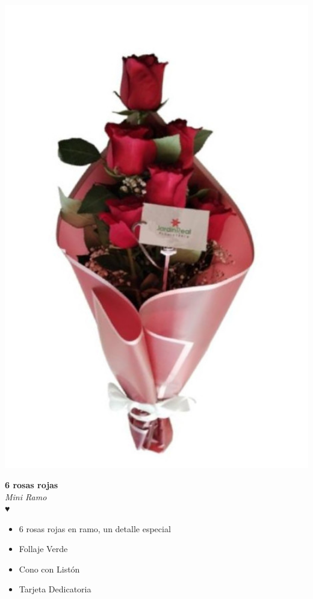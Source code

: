 \documentclass{article}
\begin{document}
\begin{minipage}{0.35\textwidth}
    \includegraphics[width=1.0\textwidth]{imagenes_extraidas/image_6_2}
\end{minipage}
\hspace{1cm}
\begin{minipage}{0.6\textwidth}
    \textcolor{cpred}{\textbf{\huge 6 rosas rojas }}\\
    {\textit{Mini Ramo}} \\
    \textcolor{cpred}{\Huge ♥} \\
    \vspace{0.5cm}
    \begin{itemize}
        \item 6 rosas rojas en ramo, un detalle especial
        \item Follaje Verde
        \item Cono con Listón
        \item Tarjeta Dedicatoria
    \end{itemize}
\end{minipage}
\end{document}
